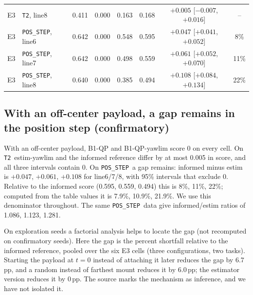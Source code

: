 \documentclass[conference]{IEEEtran}
\newcommand{\POS}{\texttt{POS\_STEP}}
\newcommand{\TT}{\texttt{T2}}
\newcommand{\pp}{\,pp}
\begin{document}
\begin{table}[t]
\begin{tabular}{@{}llcccccc@{}}
E3 & \TT, line8 & 0.411 & 0.000 & 0.163 & 0.168 & $+0.005$ [$-0.007$, $+0.016$] & -- \\ %
E3 & \POS, line6 & 0.642 & 0.000 & 0.548 & 0.595 & $+0.047$ [$+0.041$, $+0.052$] & 8\% \\ %
E3 & \POS, line7 & 0.642 & 0.000 & 0.498 & 0.559 & $+0.061$ [$+0.052$, $+0.070$] & 11\% \\ %
E3 & \POS, line8 & 0.640 & 0.000 & 0.385 & 0.494 & $+0.108$ [$+0.084$, $+0.134$] & 22\% \\ %
\bottomrule
\end{tabular}
\end{table}

\subsection{With an off-center payload, a gap remains in the position step (confirmatory)}
With an off-center payload, B1-QP and B1-QP-yawlim score 0 on every cell. %
On \TT\ estim-yawlim and the informed reference differ by at most 0.005 in score, and all three intervals contain 0. %
On \POS\ a gap remains: informed minus estim is $+0.047$, $+0.061$, $+0.108$ for line6/7/8, with 95\% intervals that exclude 0. %
Relative to the informed score (0.595, 0.559, 0.494) this is 8\%, 11\%, 22\%; computed from the table values it is 7.9\%, 10.9\%, 21.9\%. %
We use this denominator throughout.
The same \POS\ data give informed/estim ratios of 1.086, 1.123, 1.281. %

On exploration seeds a factorial analysis helps to locate the gap (not recomputed on confirmatory seeds).
Here the gap is the percent shortfall relative to the informed reference, pooled over the six E3 cells (three configurations, two tasks). %
Starting the payload at $t=0$ instead of attaching it later reduces the gap by 6.7\pp, and a random instead of farthest mount reduces it by 6.0\pp; the estimator version reduces it by 0\pp.
The source marks the mechanism as inference, and we have not isolated it.
\end{document}
